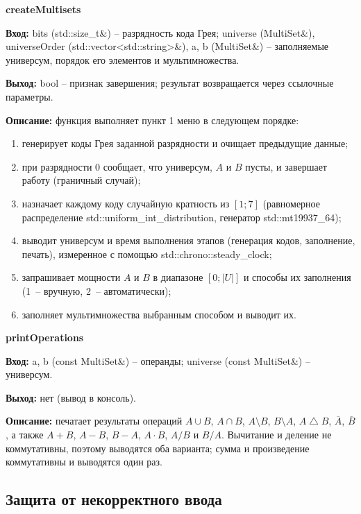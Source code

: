 \documentclass[14pt,a4paper]{extreport}
\newcommand{\card}[1]{\left|#1\right|}
\newcommand{\code}[1]{{\ttfamily #1}}
\newcommand{\bigtri}{\mathbin{\triangle}}
\begin{document}
\textbf{createMultisets}

\textbf{Вход:} \code{bits} (\code{std::size\_t\&}) -- разрядность кода Грея; \code{universe} (\code{MultiSet\&}), \code{universeOrder} (\code{std::vector<std::string>\&}), \code{a}, \code{b} (\code{MultiSet\&}) -- заполняемые универсум, порядок его элементов и мультимножества.

\textbf{Выход:} \code{bool} -- признак завершения; результат возвращается через ссылочные параметры.

\textbf{Описание:} функция выполняет пункт 1 меню в следующем порядке:
\begin{enumerate}
\item генерирует коды Грея заданной разрядности и очищает предыдущие данные;
\item при разрядности 0 сообщает, что универсум, $A$ и $B$ пусты, и завершает работу (граничный случай);
\item назначает каждому коду случайную кратность из $[1;7]$ (равномерное распределение \code{std::uniform\_int\_distribution}, генератор \code{std::mt19937\_64});
\item выводит универсум и время выполнения этапов (генерация кодов, заполнение, печать), измеренное с помощью \code{std::chrono::steady\_clock};
\item запрашивает мощности $A$ и $B$ в диапазоне $[0;\card{U}]$ и способы их заполнения (1~-- вручную, 2~-- автоматически);
\item заполняет мультимножества выбранным способом и выводит их.
\end{enumerate}

\textbf{printOperations}

\textbf{Вход:} \code{a}, \code{b} (\code{const MultiSet\&}) -- операнды; \code{universe} (\code{const MultiSet\&}) -- универсум.

\textbf{Выход:} нет (вывод в консоль).

\textbf{Описание:} печатает результаты операций $A\cup B$, $A\cap B$, $A\setminus B$, $B\setminus A$, $A\bigtri B$, $\overline{A}$, $\overline{B}$, а также $A+B$, $A-B$, $B-A$, $A\cdot B$, $A/B$ и $B/A$. Вычитание и деление не коммутативны, поэтому выводятся оба варианта; сумма и произведение коммутативны и выводятся один раз.

\subsection{Защита от некорректного ввода}
\end{document}
